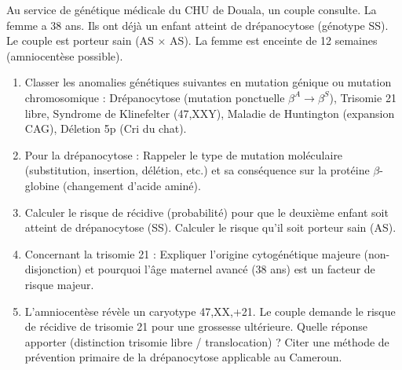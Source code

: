 \documentclass[11pt]{article}
\begin{document}
\begin{exercice}
Au service de génétique médicale du CHU de Douala, un couple consulte. La femme a 38 ans. Ils ont déjà un enfant atteint de drépanocytose (génotype SS). Le couple est porteur sain (AS $\times$ AS). La femme est enceinte de 12 semaines (amniocentèse possible).

\begin{enumerate}
\item Classer les anomalies génétiques suivantes en \og mutation génique \fg ou \og mutation chromosomique \fg : Drépanocytose (mutation ponctuelle $\beta^A \to \beta^S$), Trisomie 21 libre, Syndrome de Klinefelter (47,XXY), Maladie de Huntington (expansion CAG), Déletion 5p (Cri du chat).
\item Pour la drépanocytose : Rappeler le type de mutation moléculaire (substitution, insertion, délétion, etc.) et sa conséquence sur la protéine $\beta$-globine (changement d'acide aminé).
\item Calculer le risque de récidive (probabilité) pour que le deuxième enfant soit atteint de drépanocytose (SS). Calculer le risque qu'il soit porteur sain (AS).
\item Concernant la trisomie 21 : Expliquer l'origine cytogénétique majeure (non-disjonction) et pourquoi l'âge maternel avancé (38 ans) est un facteur de risque majeur.
\item L'amniocentèse révèle un caryotype 47,XX,+21. Le couple demande le risque de récidive de trisomie 21 pour une grossesse ultérieure. Quelle réponse apporter (distinction trisomie libre / translocation) ? Citer une méthode de prévention primaire de la drépanocytose applicable au Cameroun.
\end{enumerate}
\end{exercice}
\end{document}
